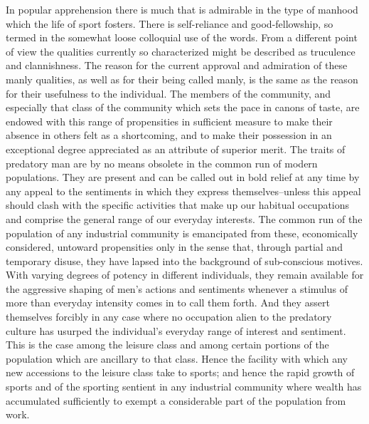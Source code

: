 \documentclass[12pt]{report}
\begin{document}
In popular apprehension there is much that is admirable in the type
of manhood which the life of sport fosters. There is self-reliance and
good-fellowship, so termed in the somewhat loose colloquial use of
the words. From a different point of view the qualities currently so
characterized might be described as truculence and clannishness. The
reason for the current approval and admiration of these manly qualities,
as well as for their being called manly, is the same as the reason for
their usefulness to the individual. The members of the community, and
especially that class of the community which sets the pace in canons of
taste, are endowed with this range of propensities in sufficient measure
to make their absence in others felt as a shortcoming, and to make
their possession in an exceptional degree appreciated as an attribute of
superior merit. The traits of predatory man are by no means obsolete in
the common run of modern populations. They are present and can be called
out in bold relief at any time by any appeal to the sentiments in
which they express themselves--unless this appeal should clash with the
specific activities that make up our habitual occupations and comprise
the general range of our everyday interests. The common run of the
population of any industrial community is emancipated from these,
economically considered, untoward propensities only in the sense
that, through partial and temporary disuse, they have lapsed into the
background of sub-conscious motives. With varying degrees of potency in
different individuals, they remain available for the aggressive shaping
of men's actions and sentiments whenever a stimulus of more than
everyday intensity comes in to call them forth. And they assert
themselves forcibly in any case where no occupation alien to the
predatory culture has usurped the individual's everyday range of
interest and sentiment. This is the case among the leisure class and
among certain portions of the population which are ancillary to that
class. Hence the facility with which any new accessions to the leisure
class take to sports; and hence the rapid growth of sports and of
the sporting sentient in any industrial community where wealth has
accumulated sufficiently to exempt a considerable part of the population
from work.
\end{document}
